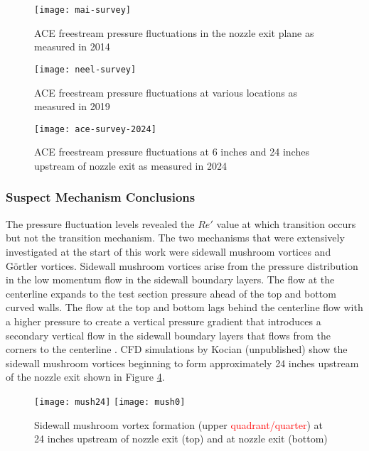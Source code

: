 \begin{figure}[ht!]
    \centering
    \texttt{[image: mai-survey]}
    \caption[ACE freestream pressure fluctuations in the nozzle exit plane as measured in 2014]{ACE freestream pressure fluctuations in the nozzle exit plane as measured in 2014 \cite{mai-dis}}
    \label{fig:mai-survey}
\end{figure}

\begin{figure}[ht!]
    \centering
    \texttt{[image: neel-survey]}
    \caption[ACE freestream pressure fluctuations at various locations as measured ii 2019]{ACE freestream pressure fluctuations at various locations as measured in 2019 \cite{neel-dis}}
    \label{fig:neel-survey}
\end{figure}

\begin{figure}[ht!]
    \centering
    \texttt{[image: ace-survey-2024]}
    \caption{ACE freestream pressure fluctuations at 6 inches and 24 inches upstream of nozzle exit as measured in 2024}
    \label{fig:ace-survey-2024}
\end{figure}

\subsubsection*{Suspect Mechanism Conclusions}

The pressure fluctuation levels revealed the $Re'$ value at which transition occurs but not the transition mechanism. The two mechanisms that were extensively investigated at the start of this work were sidewall mushroom vortices and Görtler vortices. Sidewall mushroom vortices arise from the pressure distribution in the low momentum flow in the sidewall boundary layers. The flow at the centerline expands to the test section pressure ahead of the top and bottom curved walls. The flow at the top and bottom lags behind the centerline flow with a higher pressure to create a vertical pressure gradient that introduces a secondary vertical flow in the sidewall boundary layers that flows from the corners to the centerline \cite{sabnis}. CFD simulations by Kocian (unpublished) show the sidewall mushroom vortices beginning to form approximately 24 inches upstream of the nozzle exit shown in Figure \ref{fig:mushrooms}. 
\begin{figure}[ht!]
    \centering
    \texttt{[image: mush24]}
    \texttt{[image: mush0]}
    \caption{Sidewall mushroom vortex formation (upper \textcolor{red}{quadrant/quarter}) at 24 inches upstream of nozzle exit (top) and at nozzle exit (bottom) }
    \label{fig:mushrooms}
\end{figure}

